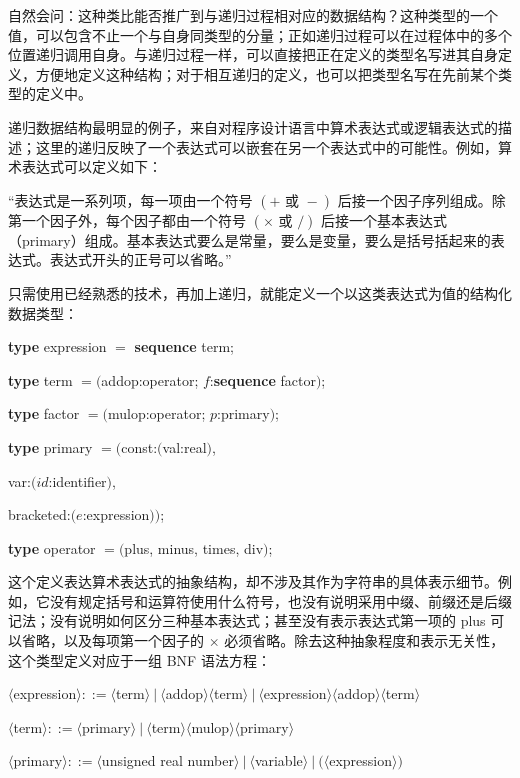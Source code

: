 \documentclass[twoside,11pt,fontset=none]{ctexbook}
\begin{document}
自然会问：这种类比能否推广到与递归过程相对应的数据结构？这种类型的一个值，可以包含不止一个与自身同类型的分量；正如递归过程可以在过程体中的多个位置递归调用自身。与递归过程一样，可以直接把正在定义的类型名写进其自身定义，方便地定义这种结构；对于相互递归的定义，也可以把类型名写在先前某个类型的定义中。

递归数据结构最明显的例子，来自对程序设计语言中算术表达式或逻辑表达式的描述；这里的递归反映了一个表达式可以嵌套在另一个表达式中的可能性。例如，算术表达式可以定义如下：

“表达式是一系列项，每一项由一个符号 $(+ \text{ 或 } -)$ 后接一个因子序列组成。除第一个因子外，每个因子都由一个符号 $(\times \text{ 或 } /)$ 后接一个基本表达式（primary）组成。基本表达式要么是常量，要么是变量，要么是括号括起来的表达式。表达式开头的正号可以省略。”

只需使用已经熟悉的技术，再加上递归，就能定义一个以这类表达式为值的结构化数据类型：

\quad \textbf{type} expression $=$ \textbf{sequence} term;

\quad \textbf{type} term $= ($addop:operator; $f$:\textbf{sequence} factor$)$;

\quad \textbf{type} factor $= ($mulop:operator; $p$:primary$)$;

\quad \textbf{type} primary $= ($const:$($val:real$)$,

\tabto*{9.3em}var:$(id$:identifier$)$,

\tabto*{9.3em}bracketed:$(e$:expression$))$;

\quad \textbf{type} operator $= ($plus, minus, times, div$)$;

这个定义表达算术表达式的抽象结构，却不涉及其作为字符串的具体表示细节。例如，它没有规定括号和运算符使用什么符号，也没有说明采用中缀、前缀还是后缀记法；没有说明如何区分三种基本表达式；甚至没有表示表达式第一项的 plus 可以省略，以及每项第一个因子的 $\times$ 必须省略。除去这种抽象程度和表示无关性，这个类型定义对应于一组 BNF 语法方程：

\quad $\langle$expression$\rangle ::= \langle$term$\rangle\ |\ \langle$addop$\rangle \langle$term$\rangle\ |\ \langle$expression$\rangle \langle$addop$\rangle \langle$term$\rangle$

\quad $\langle$term$\rangle ::= \langle$primary$\rangle\ |\ \langle$term$\rangle\langle$mulop$\rangle\langle$primary$\rangle$

\quad $\langle$primary$\rangle ::= \langle$unsigned real number$\rangle\ |\ \langle$variable$\rangle\ |\ (\langle$expression$\rangle)$
\end{document}
